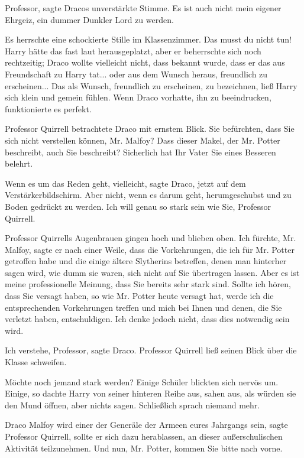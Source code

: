 \glqq{}Professor\grqq{}, sagte Dracos unverstärkte Stimme. \glqq{}Es ist auch
nicht mein eigener Ehrgeiz, ein dummer Dunkler Lord zu werden.\grqq{}

Es herrschte eine schockierte Stille im Klassenzimmer. Das musst du nicht tun!
Harry hätte das fast laut herausgeplatzt, aber er beherrschte sich noch
rechtzeitig; Draco wollte vielleicht nicht, dass bekannt wurde, dass er das aus
Freundschaft zu Harry tat... oder aus dem Wunsch heraus, freundlich zu
erscheinen... Das als Wunsch, freundlich zu erscheinen, zu bezeichnen, ließ
Harry sich klein und gemein fühlen. Wenn Draco vorhatte, ihn zu beeindrucken,
funktionierte es perfekt.

Professor Quirrell betrachtete Draco mit ernstem Blick. \glqq{}Sie befürchten,
dass Sie sich nicht verstellen können, Mr. Malfoy? Dass dieser Makel, der Mr.
Potter beschreibt, auch Sie beschreibt? Sicherlich hat Ihr Vater Sie eines
Besseren belehrt.\grqq{}

\glqq{}Wenn es um das Reden geht, vielleicht\grqq{}, sagte Draco, jetzt auf dem
Verstärkerbildschirm. \glqq{}Aber nicht, wenn es darum geht, herumgeschubst und
zu Boden gedrückt zu werden. Ich will genau so stark sein wie Sie, Professor
Quirrell.\grqq{}

Professor Quirrells Augenbrauen gingen hoch und blieben oben. \glqq{}Ich fürchte,
Mr. Malfoy\grqq{}, sagte er nach einer Weile, \glqq{}dass die Vorkehrungen, die
ich für Mr. Potter getroffen habe und die einige ältere Slytherins betreffen,
denen man hinterher sagen wird, wie dumm sie waren, sich nicht auf Sie
übertragen lassen. Aber es ist meine professionelle Meinung, dass Sie bereits
sehr stark sind. Sollte ich hören, dass Sie versagt haben, so wie Mr. Potter
heute versagt hat, werde ich die entsprechenden Vorkehrungen treffen und mich
bei Ihnen und denen, die Sie verletzt haben, entschuldigen. Ich denke jedoch
nicht, dass dies notwendig sein wird.\grqq{}

\glqq{}Ich verstehe, Professor\grqq{}, sagte Draco. Professor Quirrell ließ
seinen Blick über die Klasse schweifen.

\glqq{}Möchte noch jemand stark werden?\grqq{} Einige Schüler blickten sich
nervös um. Einige, so dachte Harry von seiner hinteren Reihe aus, sahen aus, als
würden sie den Mund öffnen, aber nichts sagen. Schließlich sprach niemand mehr.

\glqq{}Draco Malfoy wird einer der Generäle der Armeen eures Jahrgangs
sein\grqq{}, sagte Professor Quirrell, \glqq{}sollte er sich dazu herablassen, an
dieser außerschulischen Aktivität teilzunehmen. Und nun, Mr. Potter, kommen Sie
bitte nach vorne.\grqq{}

